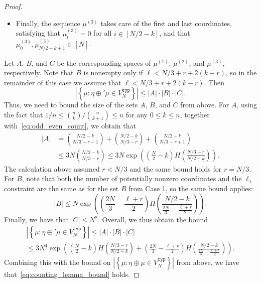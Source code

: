 \documentclass[11pt]{article}
\numberwithin{equation}{section}
\theoremstyle{definition}
\begin{document}
\begin{proof}
\begin{itemize}
\item Finally, the sequence $\mu^{(3)}$ takes care of the first and last coordinates, satisfying that 
$\mu^{(3)}_i = 0$ for all $i \in [N/2 - k]$, 
and that 
$\mu^{(3)}_{0}, \mu^{(3)}_{N/2 - k + 1} \in [N]$. 
\end{itemize}
Let $A$, $B$, and $C$ be the corresponding spaces of $\mu^{(1)}$, $\mu^{(2)}$, and $\mu^{(3)}$, respectively. 
Note that $B$ is nonempty only if 
$\ell < N/3 + r + 2(k-r)$, 
so in the remainder of this case we assume that 
$\ell < N/3 + r + 2(k-r)$. 
Then 
\begin{equation*}
    \left| \left\{\mu :  \eta \oplus' \mu \in V_{N}^{\mathtt{typ}} \right\} \right| \leq |A|\cdot |B| \cdot |C| . 
\end{equation*}
Thus, we need to bound the size of the sets $A$, $B$, and $C$ from above. 
For $A$, 
using the fact that 
$1/n \leq \binom{n}{k} / \binom{n}{k+1} \leq n$ 
for any $0 \leq k \leq n$, 
together with~\eqref{eq:odd_even_count}, we obtain that 
\begin{align*}
    |A| 
    &= \binom{N/2-k}{N/3-r-1} + \binom{N/2-k}{N/3-r} + \binom{N/2-k}{N/3-r+1} \\
    &\leq 3N \binom{N/2-k}{N/3-r} 
    \leq 3N \exp \left( \left( \frac{N}{2} - k \right) H \left( \frac{N/3-r}{N/2-k} \right) \right).
\end{align*}
The calculation above assumed $r < N/3$ 
and the same bound holds for $r = N/3$. 
For $B$, 
note that both the number of potentially nonzero coordinates and the $\ell_{1}$ constraint are the same as for the set $B$ from Case 1, so the same bound applies: 
\[
|B| 
\leq 
N
\exp \left( \left( \frac{2N}{3} - \frac{\ell + r}{2} \right) H \left( \frac{N/2 - k}{\frac{2N}{3} - \frac{\ell + r}{2}} \right) \right).
\] 
Finally, we have that $|C| \leq N^{2}$. 
Overall, we thus obtain the bound 
\begin{multline*}
\left| \left\{\mu :  \eta \oplus' \mu \in V_{N}^{\mathtt{typ}} \right\} \right| 
\leq |A|\cdot |B| \cdot |C|  \\ 
\leq 3 N^{4} \exp \left( \left( \frac{N}{2} - k \right) H \left( \frac{N/3-r}{N/2-k} \right) 
+ \left( \frac{2N}{3}  -  \frac{\ell + r}{2}  \right) H \left( \frac{N/2 - k}{\frac{2N}{3} -  \frac{\ell + r}{2}} \right)  \right).
\end{multline*}
Combining this with the bound on 
$\left| \left\{\mu :  \eta \oplus \mu \in V_{N}^{\mathtt{typ}} \right\} \right|$ 
from above, 
we have that~\eqref{eq:counting_lemma_bound} holds. 




\end{proof}
\end{document}
